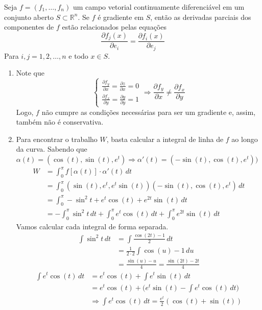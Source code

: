 \documentclass[../main.tex]{subfiles}
\begin{document}
\begin{solucao}
\begin{teorema}
			Seja $f=(f_1, \dots, f_n)$ um campo vetorial continuamente diferenciável em um conjunto aberto $S\subset \mathbb{R}^n$. Se $f$ é gradiente em $S$, então as derivadas parciais dos componentes de $f$ estão relacionados pelas equações
			\[
			\frac{\partial f_j(x)}{\partial e_i}=\frac{\partial f_i(x)}{\partial e_j}
			\]
			Para $i,j=1,2,\dots,n$ e todo $x\in S$.
		\end{teorema}
		\begin{enumerate}[label=\alph*)]
			\item Note que
			\[
			\begin{cases} \frac{\partial f_y}{\partial x}=\frac{\partial z}{\partial x}=0\\ \frac{\partial f_x}{\partial y}=\frac{\partial y}{\partial y}=1\end{cases}\Rightarrow  \frac{\partial f_y}{\partial x} \neq \frac{\partial f_x}{\partial y}
			\]
			Logo, $f$ não cumpre as condições necessárias para ser um gradiente e, assim, também não é conservativa.
			\item Para encontrar o trabalho $W$, basta calcular a integral de linha de $f$ ao longo da curva. Sabendo que $\alpha(t)=(\cos(t),\sin(t),e^t)\Rightarrow\alpha'(t)=(-\sin(t), \cos(t), e^t))$
			\begin{align*}
				W
				&= \int_0^\pi f[\alpha(t)]\cdot \alpha'(t)\, dt\\
				&= \int_0^\pi (\sin(t), e^t, e^t\sin(t))(-\sin(t), \cos(t), e^t)\, dt\\
				&= \int_0^\pi -\sin^2t +e^t\cos(t) +e^{2t}\sin(t)\, dt\\
				&= -\int_0^\pi \sin^2t\, dt +\int_0^\pi e^t\cos(t)\, dt +\int_0^\pi e^{2t}\sin(t)\, dt
			\end{align*}
			Vamos calcular cada integral de forma separada.
			\begin{align*}
				\int \sin^2t\, dt
				&= \int \frac{\cos(2t)-1}{2}\, dt\\
				&= \frac{1}{2\cdot 2}\int \cos(u)-1\, du\\
				&= \frac{\sin(u)-u}{4}=\frac{\sin(2t)-2t}{4} 
			\end{align*}
			\begin{align*}
				\int e^t\cos(t)\, dt
				&= e^t\cos(t) +\int e^t\sin(t)\, dt\\
				&= e^t\cos(t) +\bigg(e^t\sin(t)-\int e^t\cos(t)\, dt\bigg)\\
				&\Rightarrow \int e^t \cos(t)\, dt= \frac{e^t}{2}(\cos(t)+\sin(t))
			\end{align*}
			\begin{align*}

\end{align*}
\end{enumerate}
\end{solucao}
\end{document}
